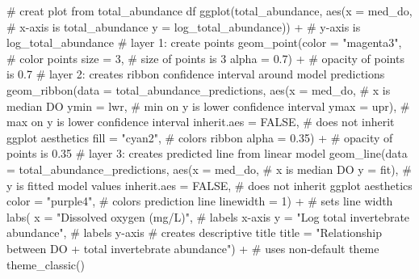 \documentclass[
  letterpaper,
  DIV=11,
  numbers=noendperiod]{scrartcl}
\newenvironment{Shaded}{\begin{snugshade}}{\end{snugshade}}
\newcommand{\AttributeTok}[1]{\textcolor[rgb]{0.40,0.45,0.13}{#1}}
\newcommand{\CommentTok}[1]{\textcolor[rgb]{0.37,0.37,0.37}{#1}}
\newcommand{\ConstantTok}[1]{\textcolor[rgb]{0.56,0.35,0.01}{#1}}
\newcommand{\DecValTok}[1]{\textcolor[rgb]{0.68,0.00,0.00}{#1}}
\newcommand{\FloatTok}[1]{\textcolor[rgb]{0.68,0.00,0.00}{#1}}
\newcommand{\FunctionTok}[1]{\textcolor[rgb]{0.28,0.35,0.67}{#1}}
\newcommand{\NormalTok}[1]{\textcolor[rgb]{0.00,0.23,0.31}{#1}}
\newcommand{\SpecialCharTok}[1]{\textcolor[rgb]{0.37,0.37,0.37}{#1}}
\newcommand{\StringTok}[1]{\textcolor[rgb]{0.13,0.47,0.30}{#1}}
\begin{document}
\begin{Shaded}
\begin{Highlighting}[]
\CommentTok{\# creat plot from total\_abundance df}
\FunctionTok{ggplot}\NormalTok{(total\_abundance,}
       \FunctionTok{aes}\NormalTok{(}\AttributeTok{x =}\NormalTok{ med\_do, }\CommentTok{\# x{-}axis is total\_abundance}
           \AttributeTok{y =}\NormalTok{ log\_total\_abundance)) }\SpecialCharTok{+} \CommentTok{\# y{-}axis is log\_total\_abundance}
  \CommentTok{\# layer 1: create points  }
  \FunctionTok{geom\_point}\NormalTok{(}\AttributeTok{color =} \StringTok{"magenta3"}\NormalTok{, }\CommentTok{\# color points}
             \AttributeTok{size =} \DecValTok{3}\NormalTok{, }\CommentTok{\# size of points is 3}
             \AttributeTok{alpha =} \FloatTok{0.7}\NormalTok{) }\SpecialCharTok{+} \CommentTok{\# opacity of points is 0.7}
  \CommentTok{\# layer 2: creates ribbon confidence interval around model predictions}
  \FunctionTok{geom\_ribbon}\NormalTok{(}\AttributeTok{data =}\NormalTok{ total\_abundance\_predictions, }
              \FunctionTok{aes}\NormalTok{(}\AttributeTok{x =}\NormalTok{ med\_do, }\CommentTok{\# x is median DO}
                  \AttributeTok{ymin =}\NormalTok{ lwr, }\CommentTok{\# min on y is lower confidence interval}
                  \AttributeTok{ymax =}\NormalTok{ upr), }\CommentTok{\# max on y is lower confidence interval}
              \AttributeTok{inherit.aes =} \ConstantTok{FALSE}\NormalTok{, }\CommentTok{\# does not inherit ggplot aesthetics}
              \AttributeTok{fill =} \StringTok{"cyan2"}\NormalTok{, }\CommentTok{\# colors ribbon}
              \AttributeTok{alpha =} \FloatTok{0.35}\NormalTok{) }\SpecialCharTok{+} \CommentTok{\# opacity of points is 0.35}
  \CommentTok{\# layer 3: creates predicted line from linear model}
  \FunctionTok{geom\_line}\NormalTok{(}\AttributeTok{data =}\NormalTok{ total\_abundance\_predictions, }
            \FunctionTok{aes}\NormalTok{(}\AttributeTok{x =}\NormalTok{ med\_do, }\CommentTok{\# x is median DO}
                \AttributeTok{y =}\NormalTok{ fit), }\CommentTok{\# y is fitted model values}
            \AttributeTok{inherit.aes =} \ConstantTok{FALSE}\NormalTok{,  }\CommentTok{\# does not inherit ggplot aesthetics}
            \AttributeTok{color =} \StringTok{"purple4"}\NormalTok{, }\CommentTok{\# colors prediction line}
            \AttributeTok{linewidth =} \DecValTok{1}\NormalTok{) }\SpecialCharTok{+} \CommentTok{\# sets line width}
  \FunctionTok{labs}\NormalTok{(}
    \AttributeTok{x =} \StringTok{"Dissolved oxygen (mg/L)"}\NormalTok{, }\CommentTok{\# labels x{-}axis}
    \AttributeTok{y =} \StringTok{"Log total invertebrate abundance"}\NormalTok{, }\CommentTok{\# labels y{-}axis}
    \CommentTok{\# creates descriptive title}
    \AttributeTok{title =} \StringTok{"Relationship between DO + total invertebrate abundance"}\NormalTok{) }\SpecialCharTok{+}
  \CommentTok{\# uses non{-}default theme}
  \FunctionTok{theme\_classic}\NormalTok{()}
\end{Highlighting}
\end{Shaded}
\end{document}
